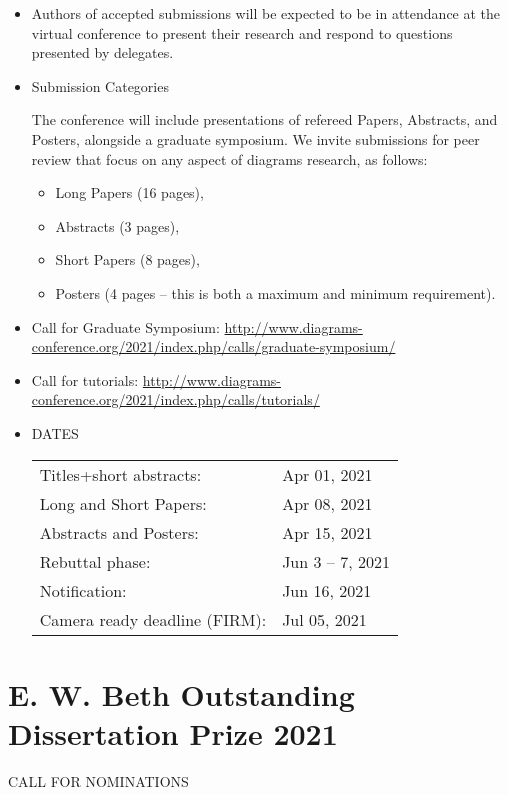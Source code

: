 \documentclass{article}
\begin{document}
\begin{itemize}
\item  Authors of accepted submissions will be expected to be in attendance at the virtual conference to present their research and respond to questions presented by delegates. 
 
\item  Submission Categories 
 
  The conference will include presentations of refereed Papers, Abstracts, and Posters, alongside a graduate symposium. We invite submissions for peer review that focus on any aspect of diagrams research, as follows: 
 
\begin{itemize}\item  Long Papers (16 pages),
\item  Abstracts (3 pages),
\item  Short Papers (8 pages),
\item  Posters (4 pages – this is both a maximum and minimum requirement).
\end{itemize} 
\item  Call for Graduate Symposium: \href{http://www.diagrams-conference.org/2021/index.php/calls/graduate-symposium/}{http://www.diagrams-conference.org/2021/index.php/calls/graduate-symposium/} 
 
\item  Call for tutorials: \href{http://www.diagrams-conference.org/2021/index.php/calls/tutorials/}{http://www.diagrams-conference.org/2021/index.php/calls/tutorials/} 
 
\item  DATES 
 
\begin{tabulary}{\linewidth}{LL}Titles+short abstracts:  & Apr 01, 2021 \\
Long and Short Papers:  & Apr 08, 2021 \\
Abstracts and Posters:  & Apr 15, 2021 \\
Rebuttal phase:  & Jun 3 – 7, 2021 \\
Notification:  & Jun 16, 2021 \\
Camera ready deadline (FIRM):  & Jul 05, 2021 \\
\end{tabulary}
 
\end{itemize}\section{E. W. Beth Outstanding Dissertation Prize 2021}\label{EWBethOutstandingDissertationPrize2021}CALL FOR NOMINATIONS 
\end{document}
